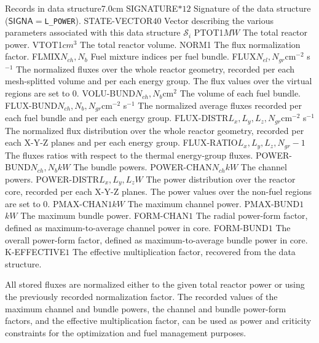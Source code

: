 \begin{DescriptionEnregistrement}{Records in  data structure}{7.0cm}
\CharEnr
 {SIGNATURE}{$*12$}
 {Signature of the  data structure ($\mathsf{SIGNA}=${\tt L\_POWER}).}
\IntEnr
 {STATE-VECTOR}{$40$}
 {Vector describing the various parameters associated with this data structure $\mathcal{S}_i$}
\DbleEnr
 {PTOT}{1}{$MW$}
 {The total reactor power.}
\DbleEnr
 {VTOT}{1}{$cm^3$}
 {The total reactor volume.}
\DbleEnr
 {NORM}{1}{}
 {The flux normalization factor.}
\IntEnr
 {FLMIX}{$N_{ch}, N_b$}
 {Fuel mixture indices per fuel bundle.}
\RealEnr
 {FLUX}{$N_{el}, N_{gr}$}{cm$^{-2}$ s$^{-1}$}
 {The normalized fluxes over the whole reactor geometry,
  recorded per each mesh-splitted volume and per each energy
  group. The flux values over the virtual regions are set to 0.}
\RealEnr
 {VOLU-BUND}{$N_{ch}, N_b$}{cm$^{2}$}
 {The volume of each fuel bundle.}
\RealEnr
 {FLUX-BUND}{$N_{ch}, N_b, N_{gr}$}{cm$^{-2}$ s$^{-1}$}
 {The normalized average fluxes recorded per each fuel bundle and per
  each energy group.}
\RealEnr
 {FLUX-DISTR}{$L_x, L_y, L_z, N_{gr}$}{cm$^{-2}$ s$^{-1}$}
 {The normalized flux distribution over the whole reactor geometry,
  recorded per each X-Y-Z planes and per each energy group.}
\RealEnr
 {FLUX-RATIO}{$L_x, L_y, L_z, N_{gr}-1$}{}
 {The fluxes ratios with respect to the thermal energy-group fluxes.}
\RealEnr
 {POWER-BUND}{$N_{ch}, N_b$}{$kW$}
 {The bundle powers.}
\RealEnr
 {POWER-CHAN}{$N_{ch}$}{$kW$}
 {The channel powers.}
\RealEnr
 {POWER-DISTR}{$L_x, L_y, L_z$}{$W$}
 {The power distribution over the reactor core, recorded per each
  X-Y-Z planes. The power values over the non-fuel regions are set to 0.}
\RealEnr
 {PMAX-CHAN}{$1$}{$kW$}
 {The maximum channel power.}
\RealEnr
 {PMAX-BUND}{$1$}{$kW$}
 {The maximum bundle power.}
\RealEnr
 {FORM-CHAN}{$1$}{}
 {The radial power-form factor, defined as maximum-to-average
  channel power in core.}
\RealEnr
 {FORM-BUND}{$1$}{}
 {The overall power-form factor, defined as maximum-to-average
  bundle power in core.}
\RealEnr
 {K-EFFECTIVE}{$1$}{}
 {The effective multiplication factor, recovered from the
   data structure.}
\end{DescriptionEnregistrement}

\vskip 0.2cm
\noindent
All stored fluxes are normalized either to the given total reactor power
or using the previously recorded normalization factor. The recorded
values of the maximum channel and bundle powers, the channel and
bundle power-form factors, and the effective multiplication factor, can
be used as power and criticity constraints for the optimization and fuel
management purposes.
\clearpage
